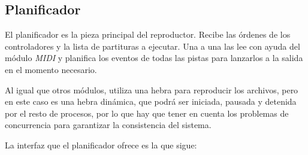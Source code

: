 \smallskip

\subsection{Planificador}

El planificador es la pieza principal del reproductor. Recibe las órdenes de los controladores y la lista de partituras a ejecutar. Una a una las lee con ayuda del módulo \textit{MIDI} y planifica los eventos de todas las pistas para lanzarlos a la salida en el momento necesario.

Al igual que otros módulos, utiliza una hebra para reproducir los archivos, pero en este caso es una hebra dinámica, que podrá ser iniciada, pausada y detenida por el resto de procesos, por lo que hay que tener en cuenta los problemas de concurrencia para garantizar la consistencia del sistema.

La interfaz que el planificador ofrece es la que sigue:

